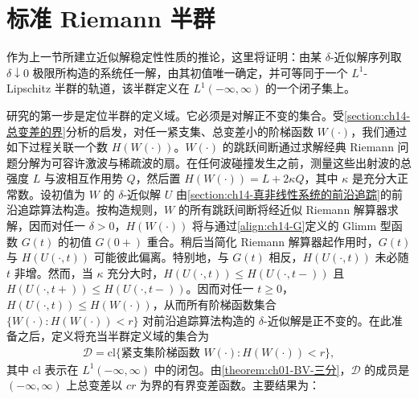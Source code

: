\documentclass[../../main.tex]{subfiles}
\begin{document}
\section{标准 Riemann 半群}\label{section:ch14-标准riemann半群}

作为上一节所建立近似解稳定性性质的推论，这里将证明：由某 $\delta$-近似解序列取 $\delta\downarrow0$ 极限所构造的系统任一解，由其初值唯一确定，并可等同于一个 $L^1$-Lipschitz 半群的轨道，该半群定义在 $L^1(-\infty,\infty)$ 的一个闭子集上。

研究的第一步是定位半群的定义域。它必须是对解正不变的集合。受\cref{section:ch14-总变差的界}分析的启发，对任一紧支集、总变差小的阶梯函数 $W(\cdot)$，我们通过如下过程关联一个数 $H(W(\cdot))$。$W(\cdot)$ 的跳跃间断通过求解经典 Riemann 问题分解为可容许激波与稀疏波的扇。在任何波碰撞发生之前，测量这些出射波的总强度 $L$ 与波相互作用势 $Q$，然后置 $H(W(\cdot))=L+2\kappa Q$，其中 $\kappa$ 是充分大正常数。设初值为 $W$ 的 $\delta$-近似解 $U$ 由\cref{section:ch14-真非线性系统的前沿追踪}的前沿追踪算法构造。按构造规则，$W$ 的所有跳跃间断将经近似 Riemann 解算器求解，因而对任一 $\delta>0$，$H(W(\cdot))$ 将与通过\eqref{align:ch14-G}定义的 Glimm 型函数 $G(t)$ 的初值 $G(0+)$ 重合。稍后当简化 Riemann 解算器起作用时，$G(t)$ 与 $H(U(\cdot,t))$ 可能彼此偏离。特别地，与 $G(t)$ 相反，$H(U(\cdot,t))$ 未必随 $t$ 非增。然而，当 $\kappa$ 充分大时，$H(U(\cdot,t))\leqslant H(U(\cdot,t-))$ 且 $H(U(\cdot,t+))\leqslant H(U(\cdot,t-))$。因而对任一 $t\geqslant0$，$H(U(\cdot,t))\leqslant H(W(\cdot))$，从而所有阶梯函数集合 $\{W(\cdot):H(W(\cdot))<r\}$ 对前沿追踪算法构造的 $\delta$-近似解是正不变的。在此准备之后，定义将充当半群定义域的集合为
\begin{align}
\mathscr{D}=\mathrm{cl}\{\text{紧支集阶梯函数 }W(\cdot):H(W(\cdot))<r\},
\label{align:ch14-domain}
\end{align}
其中 $\mathrm{cl}$ 表示在 $L^1(-\infty,\infty)$ 中的闭包。由\cref{theorem:ch01-BV-三分}，$\mathscr{D}$ 的成员是 $(-\infty,\infty)$ 上总变差以 $cr$ 为界的有界变差函数。主要结果为：
\end{document}
